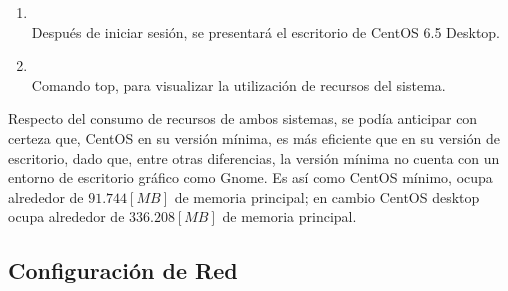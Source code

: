 \documentclass[11pt]{article}
\begin{document}
\begin{enumerate}
	        \item
	        	\begin{minipage}[t]{\linewidth}
			        \raggedright
			        \medskip
			        \\Después de iniciar sesión, se presentará el escritorio de CentOS 6.5 Desktop.
		        \end{minipage}

		    \item
	        	\begin{minipage}[t]{\linewidth}
			        \raggedright
			        \medskip
			        \\Comando top, para visualizar la utilización de recursos del sistema.
		        \end{minipage}
		    \end{enumerate}

		    Respecto del consumo de recursos de ambos sistemas, se podía anticipar con certeza que, CentOS en su versión mínima, es más eficiente que en su versión de escritorio, dado que, entre otras diferencias, la versión mínima no cuenta con un entorno de escritorio gráfico como Gnome. Es así como CentOS mínimo, ocupa alrededor de $91.744 [MB]$ de memoria principal; en cambio CentOS desktop ocupa alrededor de $336.208 [MB]$ de memoria principal.
\subsection{Configuración de Red}
\end{document}
